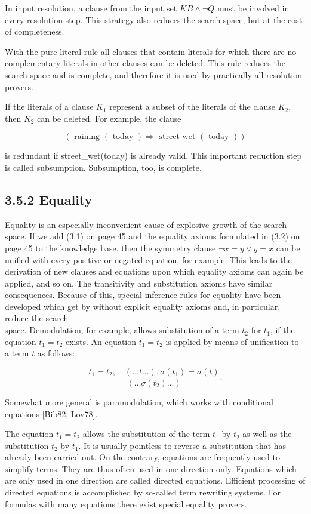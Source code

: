 \documentclass[10pt]{book}
\begin{document}
In input resolution, a clause from the input set $K B \wedge \neg Q$ must be involved in every resolution step. This strategy also reduces the search space, but at the cost of completeness.

With the pure literal rule all clauses that contain literals for which there are no complementary literals in other clauses can be deleted. This rule reduces the search space and is complete, and therefore it is used by practically all resolution provers.

If the literals of a clause $K_{1}$ represent a subset of the literals of the clause $K_{2}$, then $K_{2}$ can be deleted. For example, the clause

$$
(\text { raining }(\text { today }) \Rightarrow \text { street_wet }(\text { today }))
$$

is redundant if street\_wet(today) is already valid. This important reduction step is called subsumption. Subsumption, too, is complete.

\subsection*{3.5.2 Equality}
Equality is an especially inconvenient cause of explosive growth of the search space. If we add (3.1) on page 45 and the equality axioms formulated in (3.2) on page 45 to the knowledge base, then the symmetry clause $\neg x=y \vee y=x$ can be unified with every positive or negated equation, for example. This leads to the derivation of new clauses and equations upon which equality axioms can again be applied, and so on. The transitivity and substitution axioms have similar consequences. Because of this, special inference rules for equality have been developed which get by without explicit equality axioms and, in particular, reduce the search\\
space. Demodulation, for example, allows substitution of a term $t_{2}$ for $t_{1}$, if the equation $t_{1}=t_{2}$ exists. An equation $t_{1}=t_{2}$ is applied by means of unification to a term $t$ as follows:


$$
\frac{t_{1}=t_{2}, \quad(\ldots t \ldots), \sigma\left(t_{1}\right)=\sigma(t)}{\left(\ldots \sigma\left(t_{2}\right) \ldots\right)} .
$$

Somewhat more general is paramodulation, which works with conditional equations [Bib82, Lov78].

The equation $t_{1}=t_{2}$ allows the substitution of the term $t_{1}$ by $t_{2}$ as well as the substitution $t_{2}$ by $t_{1}$. It is usually pointless to reverse a substitution that has already been carried out. On the contrary, equations are frequently used to simplify terms. They are thus often used in one direction only. Equations which are only used in one direction are called directed equations. Efficient processing of directed equations is accomplished by so-called term rewriting systems. For formulas with many equations there exist special equality provers.
\end{document}
